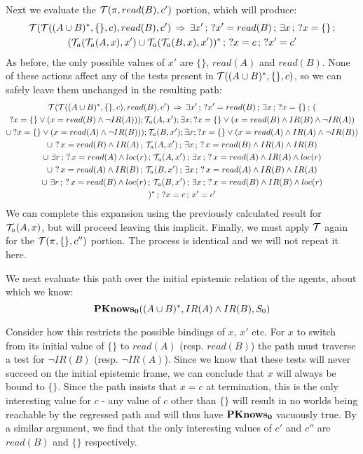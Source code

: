 Next we evaluate the $\mathcal{T}(\pi,read(B),c')$ portion, which will produce:\begin{multline*}
\mathcal{T}(\mathcal{T}((A\cup B)^{*},\{\},c),read(B),c')\,\Rightarrow\,\exists x'\,;\,?x'=read(B)\,;\,\exists x\,;\,?x=\{\}\,;\\
(\mathcal{T}_{a}(\mathcal{T}_{a}(A,x),x')\cup\mathcal{T}_{a}(\mathcal{T}_{a}(B,x),x'))^{*}\,;\,?x=c\,;\,?x'=c'\end{multline*}
As before, the only possible values of $x'$ are $\{\}$, $read(A)$
and $read(B)$. None of these actions affect any of the tests present
in $\mathcal{T}((A\cup B)^{*},\{\},c)$, so we can safely leave them unchanged
in the resulting path:\begin{multline*}
\mathcal{T}(\mathcal{T}((A\cup B)^{*},\{\},c),read(B),c')\,\Rightarrow\,\exists x'\,;\,?x'=read(B)\,;\,\exists x\,;\,?x=\{\}\,;\,(\\
?x=\{\}\vee(x=read(B)\wedge\neg IR(A)));\mathcal{T}_{a}(A,x');\exists x;?x=\{\}\vee(x=read(B)\wedge IR(B)\wedge\neg IR(A))\\
\cup\,?x=\{\}\vee(x=read(A)\wedge\neg IR(B)));\mathcal{T}_{a}(B,x');\exists x;?x=\{\}\vee(x=read(A)\wedge IR(A)\wedge\neg IR(B))\\
\cup\,\,?\, x=read(B)\wedge IR(A)\,;\,\mathcal{T}_{a}(A,x')\,;\,\exists x\,;\,?\, x=read(B)\wedge IR(A)\wedge IR(B)\\
\cup\,\,\exists r\,;\,?\, x=read(A)\wedge loc(r)\,;\,\mathcal{T}_{a}(A,x')\,;\,\exists x\,;\,?\, x=read(A)\wedge IR(A)\wedge loc(r)\\
\cup\,\,?\, x=read(A)\wedge IR(B)\,;\,\mathcal{T}_{a}(B,x')\,;\,\exists x\,;\,?\, x=read(A)\wedge IR(B)\wedge IR(A)\\
\cup\,\,\exists r\,;\,?\, x=read(B)\wedge loc(r)\,;\,\mathcal{T}_{a}(B,x')\,;\,\exists x\,;\,?\, x=read(B)\wedge IR(B)\wedge loc(r)\\
)^{*}\,;\,?x=c\,;\, x'=c'\end{multline*}
We can complete this expansion using the previously calculated result
for $\mathcal{T}_{a}(A,x)$, but will proceed leaving this implicit. Finally,
we must apply $\mathcal{T}$ again for the $\mathcal{T}(\pi,\{\},c'')$ portion.
The process is identical and we will not repeat it here.

We next evaluate this path over the initial epistemic relation of
the agents, about which we know:\[
\mathbf{PKnows_{0}}((A\cup B)^{*},IR(A)\wedge IR(B),S_{0})\]


Consider how this restricts the possible bindings of $x$, $x'$ etc.
For $x$ to switch from its initial value of $\{\}$ to $read(A)$
(resp. $read(B)$) the path must traverse a test for $\neg IR(B)$
(resp. $\neg IR(A)$). Since we know that these tests will never succeed
on the initial epistemic frame, we can conclude that $x$ will always
be bound to $\{\}$. Since the path insists that $x=c$ at termination,
this is the only interesting value for $c$ - any value of $c$ other
than $\{\}$ will result in no worlds being reachable by the regressed
path and will thus have $\mathbf{PKnows_{0}}$ vacuously true. By a similar argument,
we find that the only interesting values of $c'$ and $c''$ are $read(B)$
and $\{\}$ respectively.

